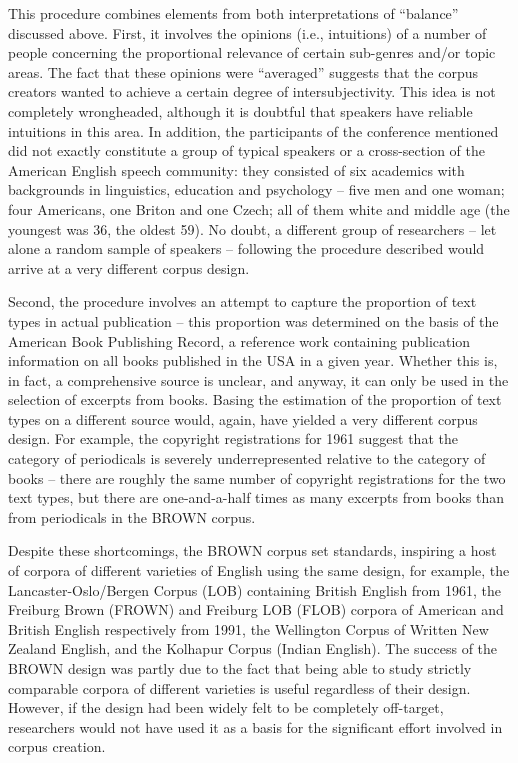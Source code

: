 This procedure combines elements from both interpretations of ``balance'' discussed above. First, it involves the opinions (i.e., intuitions) of a number of people concerning the proportional relevance of certain sub-genres and/or topic areas. The fact that these opinions were ``averaged'' suggests that the corpus creators wanted to achieve a certain degree of intersubjectivity. This idea is not completely wrongheaded, although it is doubtful that speakers have reliable intuitions in this area. In addition, the participants of the conference mentioned did not exactly constitute a group of typical speakers or a cross-section of the American English speech community: they consisted of six academics with backgrounds in linguistics, education and psychology -- five men and one woman; four Americans, one Briton and one Czech; all of them white and middle age (the youngest was 36, the oldest 59). No doubt, a different group of researchers -- let alone a random sample of speakers -- following the procedure described would arrive at a very different corpus design.

Second, the procedure involves an attempt to capture the proportion of text types in actual publication -- this proportion was determined on the basis of the American Book Publishing Record, a reference work containing publication information on all books published in the USA in a given year. Whether this is, in fact, a comprehensive source is unclear, and anyway, it can only be used in the selection of excerpts from books. Basing the estimation of the proportion of text types on a different source would, again, have yielded a very different corpus design. For example, the copyright registrations for 1961 suggest that the category of periodicals is severely underrepresented relative to the category of books -- there are roughly the same number of copyright registrations for the two text types, but there are one-and-a-half times as many excerpts from books than from periodicals in the BROWN corpus.

Despite these shortcomings, the BROWN corpus set standards, inspiring a host of corpora of different varieties of English using the same design, for example, the Lancaster-Oslo/Bergen Corpus (LOB) containing British English from 1961, the Freiburg Brown (FROWN) and Freiburg LOB (FLOB) corpora of American and British English respectively from 1991, the Wellington Corpus of Written New Zealand English, and the Kolhapur Corpus (Indian English). The success of the BROWN design was partly due to the fact that being able to study strictly comparable corpora of different varieties is useful regardless of their design. However, if the design had been widely felt to be completely off-target, researchers would not have used it as a basis for the significant effort involved in corpus creation.

